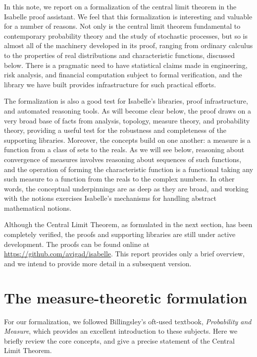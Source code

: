 \documentclass{article}
\begin{document}
In this note, we report on a formalization of the central limit theorem in the Isabelle proof assistant. We feel that this formalization is interesting and valuable for a number of reasons. Not only is the central limit theorem fundamental to contemporary probability theory and the study of stochastic processes, but so is almost all of the machinery developed in its proof, ranging from ordinary calculus to the properties of real distributions and characteristic functions, discussed below. There is a pragmatic need to have statistical claims made in engineering, risk analysis, and financial computation subject to formal verification, and the library we have built provides infrastructure for such practical efforts.

The formalization is also a good test for Isabelle's libraries, proof infrastructure, and automated reasoning tools. As will become clear below, the proof draws on a very broad base of facts from analysis, topology, measure theory, and probability theory, providing a useful test for the robustness and completeness of the supporting libraries. Moreover, the concepts build on one another: a measure is a function from a class of sets to the reals. As we will see below, reasoning about convergence of measures involves reasoning about sequences of such functions, and the operation of forming the characteristic function is a functional taking any such measure to a function from the reals to the complex numbers. In other words, the conceptual underpinnings are as deep as they are broad, and working with the notions exercises Isabelle's mechanisms for handling abstract mathematical notions.

Although the Central Limit Theorem, as formulated in the next section, has been completely verified, the proofs and supporting libraries are still under active development. The proofs can be found online at \url{https://github.com/avigad/isabelle}. This report provides only a brief overview, and we intend to provide more detail in a subsequent version.


\section{The measure-theoretic formulation}

For our formalization, we followed Billingsley's oft-used textbook, \emph{Probability and Measure}, which provides an excellent introduction to these subjects. Here we briefly review the core concepts, and give a precise statement of the Central Limit Theorem.
\end{document}
